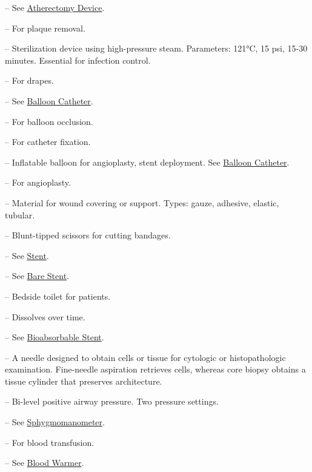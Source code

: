 -- See \hyperlink{Atherectomy Device}{Atherectomy Device}.


-- For plaque removal.

-- Sterilization device using high-pressure steam. Parameters: 121°C, 15 psi, 15-30 minutes. Essential for infection control.

-- For drapes.

-- See \hyperlink{Balloon Catheter}{Balloon Catheter}.

-- For balloon occlusion.

-- For catheter fixation.

-- Inflatable balloon for angioplasty, stent deployment. See \hyperlink{Balloon Catheter}{Balloon Catheter}.

-- For angioplasty.

-- Material for wound covering or support. Types: gauze, adhesive, elastic, tubular.

-- Blunt-tipped scissors for cutting bandages.

-- See \hyperlink{Stent}{Stent}.

-- See \hyperlink{Bare Stent}{Bare Stent}.

-- Bedside toilet for patients.

-- Dissolves over time.

-- See \hyperlink{Bioabsorbable Stent}{Bioabsorbable Stent}.

-- A needle designed to obtain cells or tissue for cytologic or histopathologic examination. Fine-needle aspiration retrieves cells, whereas core biopsy obtains a tissue cylinder that preserves architecture.

-- Bi-level positive airway pressure. Two pressure settings.

-- See \hyperlink{Sphygmomanometer}{Sphygmomanometer}.

-- For blood transfusion.

-- See \hyperlink{Blood Warmer}{Blood Warmer}.

